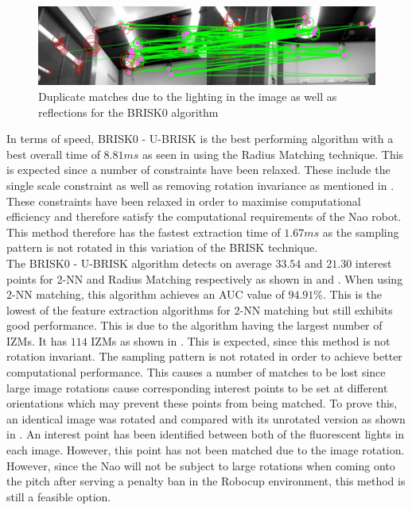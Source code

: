 \documentclass{report}
\begin{document}
\begin{figure}
  \centering
    \includegraphics[width=1.0\textwidth]{../Drawings/problems/Reflections.jpg}
    \caption{Duplicate matches due to the lighting in the image as well as reflections for the BRISK0 algorithm} 
    \label{fig:duplicateMatchesBrisk4}
\end{figure}



In terms of speed, BRISK0 - U-BRISK is the best performing algorithm with a best overall time of $8.81 ms$ as seen in  using the Radius Matching technique.  This is expected since a number of constraints have been relaxed. These include the single scale constraint as well as removing rotation invariance as mentioned in . These constraints have been relaxed in order to maximise computational efficiency and therefore satisfy the computational requirements of the Nao robot. This method therefore has the fastest extraction time of $1.67 ms$ as the sampling pattern is not rotated in this variation of the BRISK technique. \\

The BRISK0 - U-BRISK algorithm detects on average $33.54$ and $21.30$ interest points for 2-NN and Radius Matching respectively as shown in  and . When using 2-NN matching, this algorithm achieves an AUC value of $94.91\%$. This is the lowest of the feature extraction algorithms for 2-NN matching but still exhibits good performance. This is due to the algorithm having the largest number of IZMs. It has $114$ IZMs as shown in . This is expected, since this method is not rotation invariant. The sampling pattern is not rotated in order to achieve better computational performance. This causes a number of matches to be lost since large image rotations cause corresponding interest points to be set at different orientations which may prevent these points from being matched. To prove this, an identical image was rotated and compared with its unrotated version as shown in . An interest point has been identified between both of the fluorescent lights in each image. However, this point has not been matched due to the image rotation. However, since the Nao will not be subject to large rotations when coming onto the pitch after serving a penalty ban in the Robocup environment, this method is still a feasible option. \\
\end{document}
